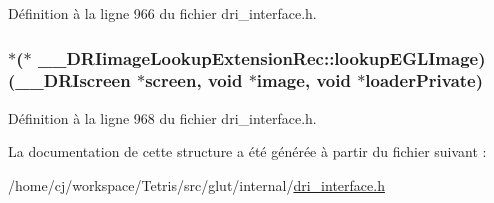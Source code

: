 Définition à la ligne 966 du fichier dri\-\_\-interface.\-h.

\hypertarget{struct_____d_r_iimage_lookup_extension_rec_a58a76edd8dcd2f9b1801af1dd9bec284}{
\subsubsection[{lookup\-E\-G\-L\-Image}]{$\ast$($\ast$ \-\_\-\-\_\-\-D\-R\-Iimage\-Lookup\-Extension\-Rec\-::lookup\-E\-G\-L\-Image)({\bf \-\_\-\-\_\-\-D\-R\-Iscreen} $\ast$screen, {\bf void} $\ast${\bf image}, {\bf void} $\ast$loader\-Private)}}\label{struct_____d_r_iimage_lookup_extension_rec_a58a76edd8dcd2f9b1801af1dd9bec284}


Définition à la ligne 968 du fichier dri\-\_\-interface.\-h.



La documentation de cette structure a été générée à partir du fichier suivant \-:\begin{DoxyCompactItemize}
\item 
/home/cj/workspace/\-Tetris/src/glut/internal/\hyperlink{dri__interface_8h}{dri\-\_\-interface.\-h}\end{DoxyCompactItemize}
